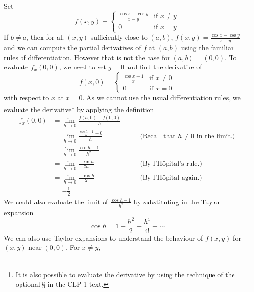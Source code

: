 \begin{eg}\label{eg partials D}
Set
\begin{equation*}
f(x,y)=\begin{cases}
             \frac{\cos x-\cos y}{x-y}&\text{if $x\ne y$}\\ 
                    0&\text{if $x=y$}
        \end{cases}
\end{equation*}
If $b\ne a$, then for all $(x,y)$ sufficiently close to $(a,b)$,
$f(x,y) = \frac{\cos x-\cos y}{x-y}$ and we can compute the 
partial derivatives of $f$ at $(a,b)$ using the familiar rules of
differentiation. However that is not the case for $(a,b)=(0,0)$. 
To evaluate $f_x(0,0)$, we need to set $y=0$ and find the derivative of
\begin{equation*}
f(x,0) = \begin{cases}
             \frac{\cos x-1}{x}&\text{if $x\ne 0$}\\ 
                    0&\text{if $x=0$}
        \end{cases}
\end{equation*}
with respect to $x$ at $x=0$. As we cannot use the usual differentiation rules, 
we evaluate the derivative\footnote{It is also possible to evaluate the derivative by using the technique of the optional \S{} in the CLP-1 text.} by applying the definition
\begin{align*}
f_x(0,0) &= \lim_{h\rightarrow 0}\frac{f(h,0)-f(0,0)}{h} \\
         &= \lim_{h\rightarrow 0}\frac{\frac{\cos h-1}{h}-0}{h}
         &\qquad\text{(Recall that $h\ne 0$ in the limit.)} \\
         &= \lim_{h\rightarrow 0}\frac{\cos h-1}{h^2} \\
         &= \lim_{h\rightarrow 0}\frac{-\sin h}{2h} 
         &\qquad\text{(By l'H\^opital's rule.)} \\
         &= \lim_{h\rightarrow 0}\frac{-\cos h}{2} 
         &\qquad\text{(By l'H\^opital again.)} \\
         &=-\frac{1}{2}
\end{align*}
We could also evaluate the limit of $\frac{\cos h-1}{h^2} $
by substituting in the Taylor expansion 
\begin{equation*}
\cos h = 1 -\frac{h^2}{2}+\frac{h^4}{4!} -\cdots
\end{equation*}
We can also use Taylor expansions to understand the behaviour of $f(x,y)$ 
for $(x,y)$ near $(0,0)$. For $x\ne y$,
\begin{align*}

\end{align*}
\end{eg}
